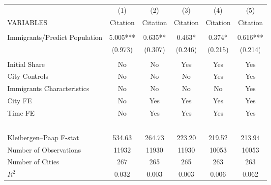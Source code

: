 \begin{tabular}{lccccc} \hline
 & (1) & (2) & (3) & (4) & (5) \\
VARIABLES & Citation & Citation & Citation & Citation & Citation \\ \hline
 &  &  &  &  &  \\
Immigrants/Predict Population & 5.005*** & 0.635** & 0.463* & 0.374* & 0.616*** \\
 & (0.973) & (0.307) & (0.246) & (0.215) & (0.214) \\
 &  &  &  &  &  \\
Initial Share & No & No & Yes & Yes & Yes \\
City Controls & No & No & No & Yes & Yes \\
Immigrants Characteristics & No & No & No & No & Yes \\
City FE & No & Yes & Yes & Yes & Yes \\
Time FE & No & Yes & Yes & Yes & Yes \\
~ & ~ & ~ & ~ & ~ & ~ \\
Kleibergen–Paap F-stat & 534.63 & 264.73 & 223.20 & 219.52 & 213.94 \\
Number of Observations & 11932 & 11930 & 11930 & 10053 & 10053 \\
Number of Cities & 267 & 265 & 265 & 263 & 263 \\
 $ R^2$ & 0.032 & 0.003 & 0.003 & 0.006 & 0.062 \\ \hline
\end{tabular}
